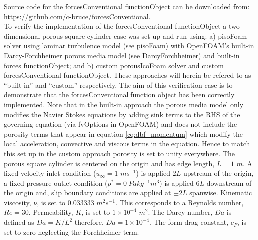 \documentclass[a4paper,11pt]{report}
\begin{document}
Source code for the forcesConventional functionObject can be downloaded from:\\\href{https://github.com/c-bruce/forcesConventional}{https://github.com/c-bruce/forcesConventional}.
\vspace{5mm}\\
To verify the implementation of the forcesConventional functionObject a two-dimensional porous square cylinder case was set up and run using: a) pisoFoam solver using laminar turbulence model (see \href{https://www.openfoam.com/documentation/guides/latest/doc/guide-applications-solvers-incompressible-pisoFoam.html}{pisoFoam}) with OpenFOAM's built-in Darcy-Forchheimer porous media model (see \href{https://www.openfoam.com/documentation/guides/latest/api/classFoam_1_1porosityModels_1_1DarcyForchheimer.html}{DarcyForchheimer}) and built-in forces functionObject; and b) custom porousIcoFoam solver and custom forcesConventional functionObject. These approaches will herein be refered to as ``built-in'' and ``custom'' respectively. The aim of this verification case is to demonstrate that the forcesConventional function object has been correctly implemented. Note that in the built-in approach the porous media model only modifies the Navier Stokes equations by adding sink terms to the RHS of the governing equation (via fvOptions in OpenFOAM) and does not include the porosity terms that appear in equation \ref{eq:dbf_momentum} which modify the local acceleration, convective and viscous terms in the equation. Hence to match this set up in the custom approach porosity is set to unity everywhere. The porous square cylinder is centered on the origin and has edge length, $L = 1$ $m$. A fixed velocity inlet condition ($u_{\infty} = 1$ $ms^{-1}$) is applied $2L$ upstream of the origin, a fixed pressure outlet condition ($p^{*} = 0$ $Pakg^{-1}m^3$) is applied $6L$ downstream of the origin and, slip boundary conditions are applied at $\pm2L$ spanwise. Kinematic viscosity, $\nu$, is set to $0.033333$ $m^2s^{-1}$. This corresponds to a Reynolds number, $Re = 30$. Permeability, $K$, is set to $1\times10^{-4}$ $m^{2}$. The Darcy number, $Da$ is defined as $Da = K/L^{2}$ therefore, $Da = 1\times10^{-4}$. The form drag constant, $c_F$, is set to zero neglecting the Forchheimer term.
\end{document}
